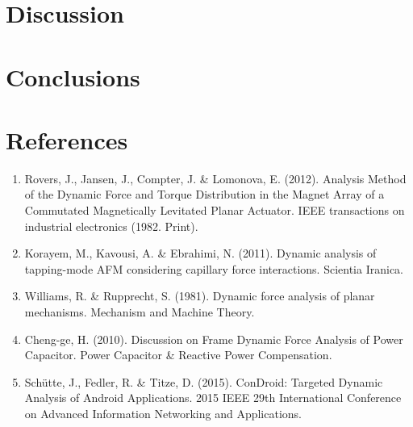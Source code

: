 \documentclass[12pt, titlepage]{article}
\begin{document}
\section{Discussion}
\newpage
\section{Conclusions}
\newpage
\section{References}
\begin{enumerate}
  \item \label{item:rovers2012} Rovers, J., Jansen, J., Compter, J. \&
    Lomonova, E. (2012). Analysis Method of the Dynamic Force and Torque
    Distribution in the Magnet Array of a Commutated Magnetically Levitated
    Planar Actuator. IEEE transactions on industrial electronics (1982. Print).
  \item \label{item:korayem2011} Korayem, M., Kavousi, A. \& Ebrahimi, N.
    (2011). Dynamic analysis of tapping-mode AFM considering capillary force
    interactions. Scientia Iranica.
  \item \label{item:williams1981} Williams, R. \& Rupprecht, S. (1981). Dynamic
    force analysis of planar mechanisms. Mechanism and Machine Theory.
  \item \label{item:cheng2010} Cheng-ge, H. (2010). Discussion on Frame Dynamic
    Force Analysis of Power Capacitor. Power Capacitor \& Reactive Power
    Compensation.
  \item \label{item:shutte2015} Schütte, J., Fedler, R. \& Titze, D. (2015).
    ConDroid: Targeted Dynamic Analysis of Android Applications. 2015 IEEE 29th
    International Conference on Advanced Information Networking and
    Applications.
\end{enumerate}
\end{document}
